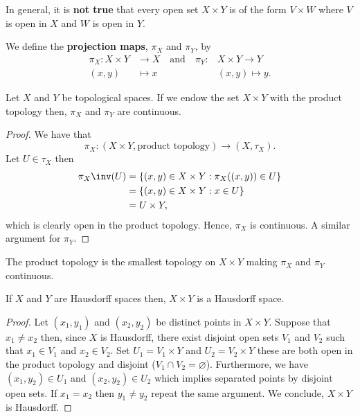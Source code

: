 \documentclass[12pt, a4paper]{article}
\begin{document}
\begin{mdremark}
    In general, it is \textbf{not true} that every open set \(X \times Y\) is of the form \(V \times W\) where \(V\) is open in \(X\) and \(W\) is open in \(Y\).
\end{mdremark}

\begin{definition}
    We define the \textbf{projection maps}, \(\pi_X\) and \(\pi_Y\), by 
    \[\begin{aligned}
        \pi_X : X \times Y &\to X \quad \text{and} \quad \pi_Y : &X \times Y \to Y \\
        (x,y) &\mapsto x &(x,y) \mapsto y.
    \end{aligned}\]
\end{definition}

\begin{mdthm}
    Let \(X\) and \(Y\) be topological spaces. If we endow the set \(X \times Y\) with the product topology then, \(\pi_X\) and \(\pi_Y\) are continuous.
\end{mdthm}

\begin{proof}
    We have that 
    \[\pi_X : (X \times Y, \text{product topology}) \to (X,\tau_X).\]
    Let \(U \in \tau_X\) then 
    \[\begin{aligned}
        \pi_X\inv(U) &= \{(x,y) \in X \times Y : \pi_X((x,y)) \in U\} \\
        &= \{(x,y) \in X \times Y : x \in U\} \\
        &= U \times Y,
    \end{aligned}\]
    which is clearly open in the product topology. Hence, \(\pi_X\) is continuous. A similar argument for \(\pi_Y\).
\end{proof}

\begin{mdremark}
    The product topology is the smallest topology on \(X \times Y\) making \(\pi_X\) and \(\pi_Y\) continuous.
\end{mdremark}

\begin{mdthm}
    If \(X\) and \(Y\) are Hausdorff spaces then, \(X \times Y\) is a Hausdorff space.
\end{mdthm}

\begin{proof}
    Let \((x_1,y_1)\) and \((x_2,y_2)\) be distinct points in \(X \times Y\). Suppose that \(x_1 \neq x_2\) then, since \(X\) is Hausdorff, there exist disjoint open sets \(V_1\) and \(V_2\) such that \(x_1 \in V_1\) and \(x_2 \in V_2\). Set \(U_1 = V_1 \times Y\) and \(U_2 = V_2 \times Y\) these are both open in the product topology and disjoint (\(V_1 \cap V_2 = \varnothing\)). Furthermore, we have \((x_1,y_2) \in U_1\) and \((x_2,y_2) \in U_2\) which implies separated points by disjoint open sets. If \(x_1=x_2\) then \(y_1 \neq y_2\) repeat the same argument. We conclude, \(X \times Y\) is Hausdorff.
\end{proof}
\end{document}
